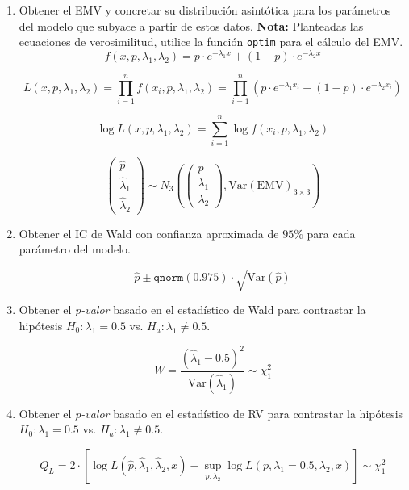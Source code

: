 \begin{enumerate}
    \item Obtener el EMV y concretar su distribución asintótica para los parámetros del modelo que subyace a partir de estos datos.
    \textbf{Nota:} Planteadas las ecuaciones de verosimilitud, utilice la función \texttt{optim} para el cálculo del EMV.
    \[
    f(x, p, \lambda_1, \lambda_2) = p \cdot e^{-\lambda_1 x} + (1-p) \cdot e^{-\lambda_2 x}
    \]

    \[
    L(x, p, \lambda_1, \lambda_2) = \prod_{i=1}^{n} f(x_i, p, \lambda_1, \lambda_2) = \prod_{i=1}^{n} \left( p \cdot e^{-\lambda_1 x_i} + (1-p) \cdot e^{-\lambda_2 x_i} \right)
    \]

    \[
    \log L(x, p, \lambda_1, \lambda_2) = \sum_{i=1}^{n} \log f(x_i, p, \lambda_1, \lambda_2)
    \]

    \[
    \begin{pmatrix}
        \widehat{p} \\
        \widehat{\lambda}_1 \\
        \widehat{\lambda}_2
    \end{pmatrix}
    \sim
    N_3
    \left(
    \begin{pmatrix}
        p \\
        \lambda_1 \\
        \lambda_2
    \end{pmatrix},
    \text{Var}(\text{EMV})_{3 \times 3}
    \right)
    \]

    \newpage

    \item Obtener el IC de Wald con confianza aproximada de \(95\%\) para cada parámetro del modelo.

    \[
    \widehat{p} \pm \texttt{qnorm}(0.975) \cdot \sqrt{\text{Var}(\widehat{p})}
    \]

    \item Obtener el \textit{p-valor} basado en el estadístico de Wald para contrastar la hipótesis \(H_0: \lambda_1 = 0.5\) vs. \(H_a: \lambda_1 \neq 0.5\).

    \[
    W = \frac{(\widehat{\lambda}_1 - 0.5)^2}{\text{Var}(\widehat{\lambda}_1)} \sim \chi^2_1
    \]

    \item Obtener el \textit{p-valor} basado en el estadístico de RV para contrastar la hipótesis \(H_0: \lambda_1 = 0.5\) vs. \(H_a: \lambda_1 \neq 0.5\).

    \[
    Q_L = 2 \cdot \left[ \log L(\widehat{p}, \widehat{\lambda}_1, \widehat{\lambda}_2, x) - \sup_{p, \lambda_2} \log L(p, \lambda_1 = 0.5, \lambda_2, x) \right] \sim \chi^2_1
    \]

\end{enumerate}
